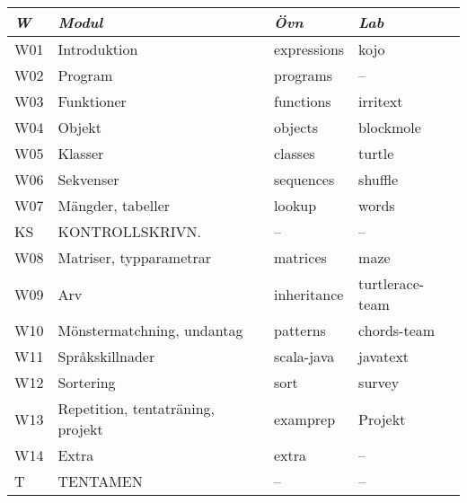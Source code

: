 \begin{tabular}{l|l|l|l}
\textit{W} & \textit{Modul} & \textit{Övn} & \textit{Lab} \\ \hline \hline
W01 & Introduktion & expressions & kojo \\
W02 & Program & programs & -- \\
W03 & Funktioner & functions & irritext \\
W04 & Objekt & objects & blockmole \\
W05 & Klasser & classes & turtle \\
W06 & Sekvenser & sequences & shuffle \\
W07 & Mängder, tabeller & lookup & words \\
KS & KONTROLLSKRIVN. & -- & -- \\
W08 & Matriser, typparametrar & matrices & maze \\
W09 & Arv & inheritance & turtlerace-team \\
W10 & Mönstermatchning, undantag & patterns & chords-team \\
W11 & Språkskillnader & scala-java & javatext \\
W12 & Sortering & sort & survey \\
W13 & Repetition, tentaträning, projekt & examprep & Projekt \\
W14 & Extra & extra & -- \\
T & TENTAMEN & -- & -- \\
\end{tabular}
